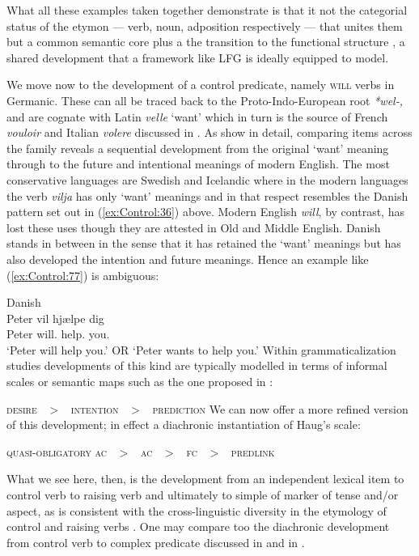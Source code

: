 \documentclass[output=paper,hidelinks]{langscibook}
\begin{document}
What all these examples taken together demonstrate is that it not the categorial status of the etymon --- verb, noun, adposition respectively --- that unites them but a common semantic core plus a the transition to the functional structure \arglist{\XCOMP}\SUBJ, a shared development that a framework like LFG is ideally equipped to model.

We move now to the development of a control predicate, namely \textsc{will} verbs in Germanic. These can all be traced back to the Proto-Indo-European root \mbox{\emph{*wel-,}} and are cognate with Latin \emph{velle} `want' which in turn is the source of French \emph{vouloir} and Italian \emph{volere} discussed in . As \citet{BorjarsVincent2019} show in detail, comparing items across the family reveals a sequential development from the original `want' meaning through to the future and intentional meanings of modern English. The most conservative languages are Swedish and Icelandic where in the modern languages the verb \emph{vilja} has only `want' meanings and in that respect resembles the Danish pattern set out in (\ref{ex:Control:36}) above. Modern English \emph{will}, by contrast, has lost these uses though they are attested in Old and Middle English. Danish stands in between in the sense that it has retained the `want' meanings but has also developed the intention and future meanings. Hence an example like (\ref{ex:Control:77}) is ambiguous:

\ea\label{ex:Control:77}Danish\\
\gll Peter vil    hj{\ae}lpe   dig\\
 Peter  {will.\PRS}  {help.\INF}  you.\ACC\\
\glt `Peter will help you.' OR `Peter wants to help you.'
 \z 
Within grammaticalization studies developments of this kind are typically modelled in terms of informal scales or semantic maps \citep{Bybee:Evolution,NarrogAuwera2011} such as the one proposed in \citet[301]{BorjarsVincent2019}:

\ea\label{ex:Control:78}
\textsc{desire  ~$>$~   intention  ~$>$~   prediction}
\z
We can now offer a more refined version of this development; in effect a diachronic instantiation of Haug's scale:

\ea\label{ex:Control:79}
\textsc{quasi-obligatory ac   ~$>$~   ac  ~$>$~   fc   ~$>$~   predlink}
\z

What we see here, then, is the development from an independent lexical item to control verb to raising verb and ultimately to simple of marker of tense and/or aspect, as is consistent with the cross-linguistic diversity in the etymology of control and raising verbs \citep{barron2001,Vincent2019a}. One may compare too the diachronic development from control verb to complex predicate discussed in \citet{Butt2014} and in .
\end{document}
